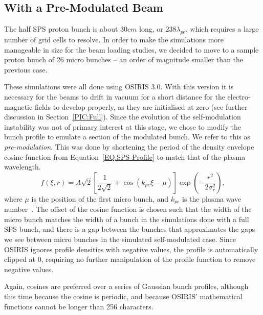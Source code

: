 
\subsection{With a Pre-Modulated Beam}
\label{Sim:PBPreMod}

The half SPS proton bunch is about $30\unit{cm}$ long, or $238\lambda_{pe}$, which requires a large number of grid cells to resolve.
In order to make the simulations more manageable in size for the beam loading studies, we decided to move to a sample proton bunch of 26 micro bunches -- an order of magnitude smaller than the previous case.

These simulations were all done using OSIRIS 3.0.
With this version it is necessary for the beams to drift in vacuum for a short distance for the electro-magnetic fields to develop properly, as they are initialised at zero (see further discussion in Section~\ref{PIC:Full}).
Since the evolution of the self-modulation instability was not of primary interest at this stage, we chose to modify the bunch profile to emulate a section of the modulated bunch.
We refer to this as \textit{pre-modulation}.
This was done by shortening the period of the density envelope cosine function from Equation~\ref{EQ:SPS-Profile} to match that of the plasma wavelength.
\begin{equation}
    f(\xi,r) = A\sqrt{2} \left[\frac{1}{2\sqrt{2}}
             + \cos\left(k_{pe}\xi - \mu\right)\right] \exp\left(-\frac{r^{2}}{2\sigma_{r}^{2}}\right), \label{EQ:PB-PreMod}
\end{equation}
where $\mu$ is the position of the first micro bunch, and $k_{pe}$ is the plasma wave number~\cite{berglyd_olsen:2015}.
The offset of the cosine function is chosen such that the width of the micro bunch matches the width of a bunch in the simulations done with a full SPS bunch, and there is a gap between the bunches that approximates the gaps we see between micro bunches in the simulated self-modulated case.
Since OSIRIS ignores profile densities with negative values, the profile is automatically clipped at $0$, requiring no further manipulation of the profile function to remove negative values.

Again, cosines are preferred over a series of Gaussian bunch profiles, although this time because the cosine is periodic, and because OSIRIS' mathematical functions cannot be longer than 256 characters.

